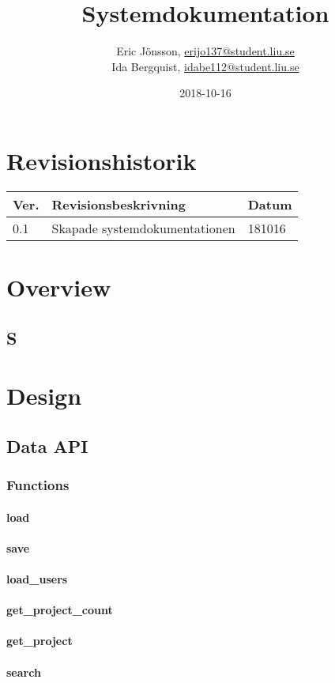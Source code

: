 \documentclass{TDP003mall}
\author{Eric Jönsson, \url{erijo137@student.liu.se}\\
  Ida Bergquist, \url{idabe112@student.liu.se}}
\title{Systemdokumentation}
\date{2018-10-16}
\begin{document}
\projectpage
\tableofcontents
\newpage
\section{Revisionshistorik}
\begin{table}[!h]
\begin{tabularx}{\linewidth}{|l|X|l|}
\hline
\textbf{Ver.} & \textbf{Revisionsbeskrivning} & \textbf{Datum} \\\hline
0.1 & Skapade systemdokumentationen & 181016 \\\hline
\end{tabularx}
\end{table}

\section{Overview}
\subsection{S}
\section{Design}
\subsection{Data API}

\subsubsection{Functions}
\paragraph{load}
\paragraph{save}
\paragraph{load\_users}
\paragraph{get\_project\_count}
\paragraph{get\_project}
\paragraph{search}
\end{document}
